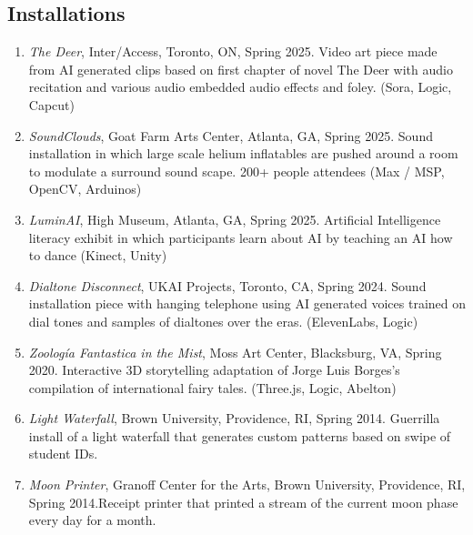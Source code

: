  
   \subsection{Installations}
  \begin{enumerate}
  
  \item \emph{The Deer}, Inter/Access, Toronto, ON, Spring 2025. \subitem Video art piece made from AI generated clips based on first chapter of novel The Deer with audio recitation and various audio embedded audio effects and foley. (Sora, Logic, Capcut)\\
  
   \item  \emph{SoundClouds}, Goat Farm Arts Center, Atlanta, GA, Spring 2025. \subitem Sound installation in which large scale helium inflatables are pushed around a room to modulate a surround sound scape. 200+ people attendees (Max / MSP, OpenCV, Arduinos)\\
   \item \emph{LuminAI}, High Museum, Atlanta, GA, Spring 2025. \subitem Artificial Intelligence literacy exhibit in which participants learn about AI by teaching an AI how to dance (Kinect, Unity) \\
    \item  \emph{Dialtone Disconnect}, UKAI Projects, Toronto, CA, Spring 2024. \subitem Sound installation piece with hanging telephone using AI generated voices trained on dial tones and samples of dialtones over the eras. (ElevenLabs, Logic)\\
  \item  \emph{Zoolog\'ia Fantastica in the Mist}, Moss Art Center, Blacksburg, VA, Spring 2020. \subitem Interactive 3D storytelling adaptation of Jorge Luis Borges's compilation of international fairy tales. (Three.js, Logic, Abelton)\\
  \item  \emph{Light Waterfall}, Brown University, Providence, RI, Spring 2014. \subitem Guerrilla install of a light waterfall that generates custom patterns based on swipe of student IDs. \\
\item  \emph{Moon Printer}, Granoff Center for the Arts, Brown University, Providence, RI, Spring 2014.\subitem  Receipt printer that printed a stream of the current moon phase every day for a month. \\
 \end{enumerate}
 
